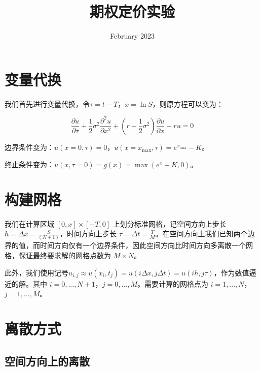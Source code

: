 \documentclass{article}
\title{期权定价实验}
\author{}
\date{February 2023}
\begin{document}
\maketitle


\vspace{2ex}

\section{变量代换}

我们首先进行变量代换，令$\tau = t-T$，$x = \ln S$，则原方程可以变为：

$$\frac{\partial u}{\partial \tau} + \frac{1}{2}\sigma^2\frac{\partial^2 u}{\partial x^2} + (r-\frac{1}{2}\sigma^2)\frac{\partial u}{\partial x} - r u = 0$$

边界条件变为：$u(x=0, \tau) = 0$，$u(x=x_{\max}, \tau) = e^{x_{\max}}-K$。

终止条件变为：$u(x,\tau=0) = g(x) = \max(e^x-K,0)$。


\section{构建网格}
我们在计算区域 $[0, x] × [-T, 0]$ 上划分标准网格，记空间方向上步长 $h = \Delta x = \frac{S}{(N + 1)}$，时间方向上步长 $\tau = \Delta t = \frac{T}{M}$。在空间方向上我们已知两个边界的值，而时间方向仅有一个边界条件，因此空间方向比时间方向多离散一个网格，保证最终要求解的网格点数为 $M × N$。

此外，我们使用记号$u_{i,j} \approx u(x_i, t_j) = u(i\Delta x, j\Delta t) = u(ih, j\tau)$，作为数值逼近的解。其中 $i = 0,..., N + 1$，$j = 0,..., M$。需要计算的网格点为 $i = 1,..., N$，$j = 1,..., M$。





\section{离散方式}


\subsection{空间方向上的离散}
\end{document}

